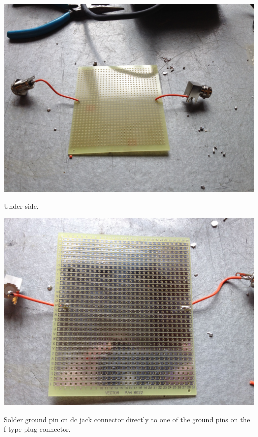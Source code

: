 \documentclass[11pt]{article} %
\begin{document}
\begin{center}
\includegraphics[scale=0.20]{lna/08.jpeg}
\end{center}

Under side. 

\begin{center}
\includegraphics[scale=0.20]{lna/09.jpeg}
\end{center}

Solder ground pin on dc jack connector directly to one of the ground pins on the f type plug connector. 
\end{document}
